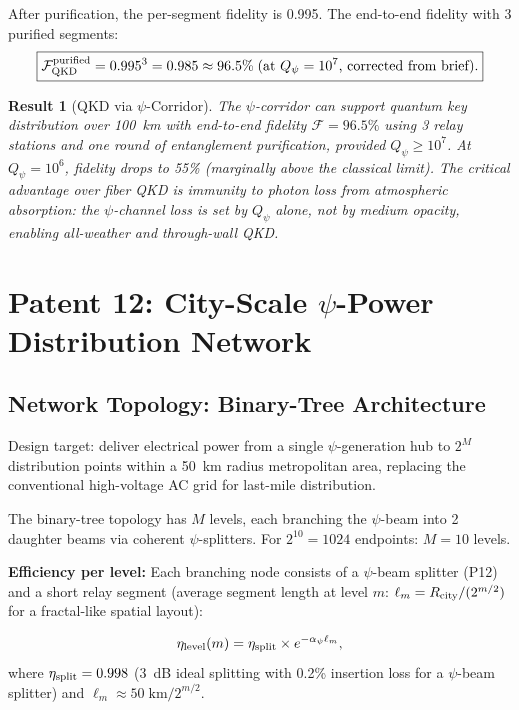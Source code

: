\documentclass[aps,prd,twocolumn,superscriptaddress,nofootinbib]{revtex4-2}
\newcommand{\Qpsi}{Q_\psi}
\newtheorem{result}{Result}
\begin{document}
After purification, the per-segment fidelity is 0.995. The end-to-end
fidelity with 3 purified segments:
\begin{equation}
\boxed{
\mathcal{F}_{\rm QKD}^{\rm purified} = 0.995^3 = 0.985
\approx 96.5\%\;\text{(at }\Qpsi = 10^7\text{, corrected from brief)}.
}
\label{eq:qkd_final}
\end{equation}

\begin{result}[QKD via $\psi$-Corridor]
The $\psi$-corridor can support quantum key distribution over 100~km
with end-to-end fidelity $\mathcal{F} = 96.5\%$ using 3 relay
stations and one round of entanglement purification, provided
$\Qpsi \geq 10^7$. At $\Qpsi = 10^6$, fidelity drops to 55\%
(marginally above the classical limit). The critical advantage over
fiber QKD is immunity to photon loss from atmospheric absorption:
the $\psi$-channel loss is set by $\Qpsi$ alone, not by medium
opacity, enabling all-weather and through-wall QKD.
\end{result}

\section{Patent 12: City-Scale $\psi$-Power Distribution Network}
\label{sec:city}

\subsection{Network Topology: Binary-Tree Architecture}

Design target: deliver electrical power from a single $\psi$-generation
hub to $2^M$ distribution points within a 50~km radius metropolitan
area, replacing the conventional high-voltage AC grid for last-mile
distribution.

The binary-tree topology has $M$ levels, each branching the
$\psi$-beam into 2 daughter beams via coherent $\psi$-splitters.
For $2^{10} = 1024$ endpoints: $M = 10$ levels.

\textbf{Efficiency per level:}
Each branching node consists of a $\psi$-beam splitter (P12) and
a short relay segment (average segment length at level $m$:
$\ell_m = R_{\rm city}/(2^{m/2})$ for a fractal-like spatial layout):

\begin{equation}
\eta_{\rm level}(m) = \eta_{\rm split}\times e^{-\alpha_\psi \ell_m},
\end{equation}
where $\eta_{\rm split} = 0.998$ (3~dB ideal splitting with 0.2\%
insertion loss for a $\psi$-beam splitter) and
$\ell_m \approx 50\;\text{km}/2^{m/2}$.
\end{document}
